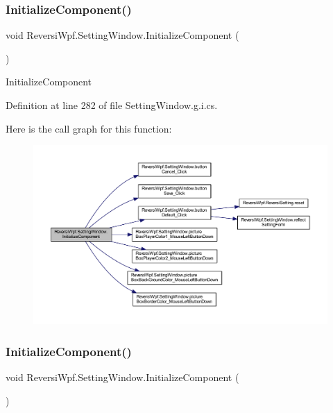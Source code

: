 \subsubsection{\texorpdfstring{Initialize\+Component()}{InitializeComponent()}\hspace{0.1cm}{\footnotesize\ttfamily [1/4]}}
{\footnotesize\ttfamily void Reversi\+Wpf.\+Setting\+Window.\+Initialize\+Component (\begin{DoxyParamCaption}{ }\end{DoxyParamCaption})}



Initialize\+Component 



Definition at line 282 of file Setting\+Window.\+g.\+i.\+cs.

Here is the call graph for this function\+:
\nopagebreak
\begin{figure}[H]
\begin{center}
\leavevmode
\includegraphics[width=350pt]{class_reversi_wpf_1_1_setting_window_a34db1776e5f52338539888d97f317a5a_cgraph}
\end{center}
\end{figure}
\mbox{\label{class_reversi_wpf_1_1_setting_window_a34db1776e5f52338539888d97f317a5a}} 
\subsubsection{\texorpdfstring{Initialize\+Component()}{InitializeComponent()}\hspace{0.1cm}{\footnotesize\ttfamily [2/4]}}
{\footnotesize\ttfamily void Reversi\+Wpf.\+Setting\+Window.\+Initialize\+Component (\begin{DoxyParamCaption}{ }\end{DoxyParamCaption})}



